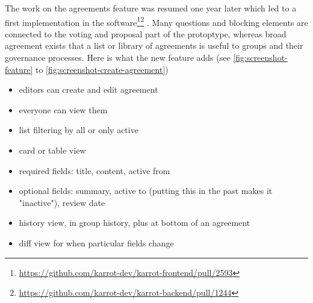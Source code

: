 \documentclass[
	a4paper,%
	11pt,%
	]{article}
\begin{document}
The work on the agreements feature was resumed one year later which led to a first implementation in the software\footnote{\label{url:feature-github-front}\url{https://github.com/karrot-dev/karrot-frontend/pull/2593}}\footnote{\label{url:feature-github-back}\url{https://github.com/karrot-dev/karrot-backend/pull/1244}} . Many questions and blocking elements are connected to the voting and proposal part of the protoptype, whereas broad agreement exists that a list or library of agreements is useful to groups and their governance processes. Here is what the new feature adds (see \autoref{fig:screenshot-feature} to \ref{fig:screenshot-create-agreement})
\begin{itemize}
    \item editors can create and edit agreement
    \item everyone can view them
    \item list filtering by all or only active
    \item card or table view
    \item required fields: title, content, active from
    \item optional fields: summary, active to (putting this in the past makes it "inactive"), review date
    \item history view, in group history, plus at bottom of an agreement
    \item diff view for when particular fields change	
\end{itemize}
\end{document}
